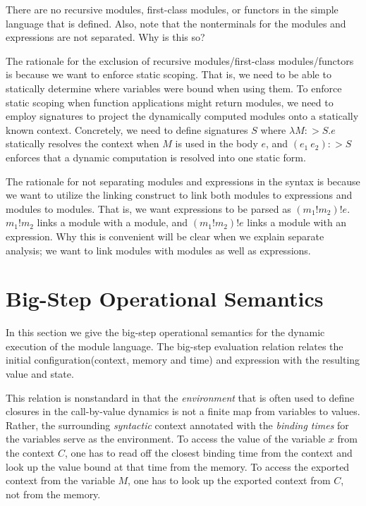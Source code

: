 \documentclass[acmsmall,screen,review]{acmart}
\theoremstyle{definition}
\newcommand*{\link}[2]{{#1}\mathtt{!}{#2}}
\begin{document}
There are no recursive modules, first-class modules, or functors in the simple language that is defined.
Also, note that the nonterminals for the modules and expressions are not separated. Why is this so?

The rationale for the exclusion of recursive modules/first-class modules/functors is because we want to enforce static scoping.
That is, we need to be able to statically determine where variables were bound when using them.
To enforce static scoping when function applications might return modules, we need to employ signatures to project the dynamically computed modules onto a statically known context.
Concretely, we need to define signatures $S$ where $\lambda M:>S.e$ statically resolves the context when $M$ is used in the body $e$, and $(e_1\:e_2):>S$ enforces that a dynamic computation is resolved into one static form.

The rationale for not separating modules and expressions in the syntax is because we want to utilize the linking construct to link both modules to expressions and modules to modules.
That is, we want expressions to be parsed as $(m_1!m_2)!e$.
$\link{m_1}{m_2}$ links a module with a module, and $(m_1!m_2)!e$ links a module with an expression.
Why this is convenient will be clear when we explain separate analysis; we want to link modules with modules as well as expressions.

\section{Big-Step Operational Semantics}

In this section we give the big-step operational semantics for the dynamic execution of the module language.
The big-step evaluation relation relates the initial configuration(context, memory and time) and expression with the resulting value and state.

This relation is nonstandard in that the \emph{environment} that is often used to define closures in the call-by-value dynamics is not a finite map from variables to values.
Rather, the surrounding \emph{syntactic} context annotated with the \emph{binding times} for the variables serve as the environment.
To access the value of the variable $x$ from the context $C$, one has to read off the closest binding time from the context and look up the value bound at that time from the memory.
To access the exported context from the variable $M$, one has to look up the exported context from $C$, not from the memory.
\end{document}
